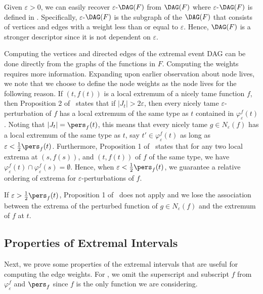 Given $\varepsilon>0$, we can easily recover $\varepsilon$-$\DAG(F)$ from
$\DAG(F)$ where $\varepsilon$-$\DAG(F)$ is defined in \cite{BerryUsing20}.
Specifically, $\varepsilon$-$\DAG(F)$ is the subgraph of the
$\DAG(F)$ that consists of vertices and edges with a weight less than or equal
to $\varepsilon$. Hence, $\DAG(F)$ is a stronger descriptor since it is not
dependent on $\varepsilon$.

Computing the vertices and directed edges of the extremal event DAG can be done
directly from the graphs of the functions in $F$. Computing the
weights requires more information. Expanding upon earlier observation about node lives, we note that we choose to define the node weights as the node lives for the following reason. If $(t, f(t))$ is a local extremum of a nicely tame function $f$,
then Proposition 2 of~\cite{BerryUsing20} states that if $|J_t|>2\varepsilon$,
then every nicely tame $\varepsilon$-perturbation of $f$ has a local extremum of
the same type as $t$ contained in $\varphi^f_{\varepsilon}(t)$. Noting that
$|J_t| = \pers_f(t)$, this means that every nicely tame $g \in
N_{\varepsilon}(f)$ has a local extremum of the same type as $t$, say $t' \in
\varphi^f_{\varepsilon}(t)$ as long as $\varepsilon < \frac{1}{2}\pers_f(t)$. Furthermore,
Proposition 1 of~\cite{BerryUsing20} states that for any two local extrema at
$(s, f(s))$, and $(t, f(t))$ of $f$ of the same type, we have $\varphi^f_{\varepsilon}(t) \cap
\varphi^f_{\varepsilon}(s) = \emptyset$.  Hence, when $\varepsilon <\frac{1}{2}\pers_f(t)$,
we guarantee a relative ordering of extrema for $\varepsilon$-perturbations of
$f$.

If $\varepsilon > \frac{1}{2}\pers_f(t)$, Proposition 1 of~\cite{BerryUsing20} does not apply and we lose the association between the extrema of the perturbed function of $g \in N_{\varepsilon}(f)$ and the extremum of $f$ at $t$.

\subsection{Properties of Extremal Intervals}

Next, we prove some properties of the extremal intervals that are useful for computing the edge weights. For , we omit the superscript and subscript $f$ from $\varphi^f_{\varepsilon}$ and $\pers_f$ since $f$ is the only function we are considering.

